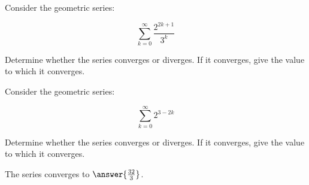 \documentclass{ximera}
\author{Jim Talamo}
\begin{document}
\begin{exercise}
Consider the geometric series:

\[
\sum_{k=0}^{\infty} \frac{2^{2k+1}}{3^k}
\]

Determine whether the series converges or diverges.  If it converges, give the value to which it converges.

\begin{multipleChoice}
\end{multipleChoice}

\end{exercise}

\begin{exercise}
Consider the geometric series:

\[
\sum_{k=0}^{\infty} 2^{3-2k}
\]

Determine whether the series converges or diverges.  If it converges, give the value to which it converges.

\begin{multipleChoice}
\end{multipleChoice}

\begin{exercise}
The series converges to $\answer{\frac{32}{3}}$.
\end{exercise}
\end{exercise}
\end{document}
